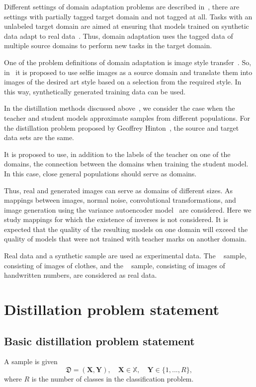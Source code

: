 \documentclass[12pt]{article}
\begin{document}
Different settings of domain adaptation problems are described in~\cite{DeepvisDA}, there are settings with partially tagged target domain and not tagged at all. Tasks with an unlabeled target domain are aimed at ensuring that models trained on synthetic data adapt to real data~\cite{UDA}. Thus, domain adaptation uses the tagged data of multiple source domains to perform new tasks in the target domain.

One of the problem definitions of domain adaptation is image style transfer~\cite{image_to_image, Transfer_Learning}.
So, in~\cite{image_to_image} it is proposed to use selfie images as a source domain and translate them into images of the desired art style based on a selection from the required style. In this way, synthetically generated training data can be used.

In the distillation methods discussed above~\cite{Hinton2015, Vapnik2016, Grabovoy2021}, we consider the case when the teacher and student models approximate samples from different populations. For the distillation problem proposed by Geoffrey Hinton~\cite{Hinton2015}, the source and target data sets are the same.

It is proposed to use, in addition to the labels of the teacher on one of the domains, the connection between the domains when training the student model. In this case, close general populations should serve as domains.

Thus, real and generated images can serve as domains of different sizes. As mappings between images, normal noise, convolutional transformations, and image generation using the variance autoencoder model~\cite{VAE} are considered. Here we study mappings for which the existence of inverses is not considered. It is expected that the quality of the resulting models on one domain will exceed the quality of models that were not trained with teacher marks on another domain.

Real data and a synthetic sample are used as experimental data. The ~\cite{FMNIST} sample, consisting of images of clothes, and the ~\cite{MNIST} sample, consisting of images of handwritten numbers, are considered as real data.

\section{Distillation problem statement}
\subsection{Basic distillation problem statement}
A sample is given
$$\mathfrak{D}=(\mathbf{X},\mathbf{Y}), \quad \mathbf{X} \in \mathbb{X},
\quad \mathbf{Y} \in \{1,...,R\},$$
where $R$ is the number of classes in the classification problem.
\end{document}
